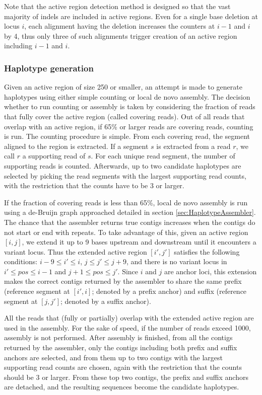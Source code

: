 \documentclass{article}
\begin{document}
Note that the active region detection method is designed so that the vast majority of indels are included in active regions. Even for a single base deletion at locus $i$, each alignment having the deletion increases the counters at $i-1$ and $i$ by 4, thus only three of such alignments trigger creation of an active region including $i-1$ and $i$.


\subsubsection{Haplotype generation}
Given an active region of size 250 or smaller, an attempt is made to generate haplotypes using either simple counting or local de novo assembly. The decision whether to run counting or assembly is taken by considering the fraction of reads that fully cover the active region (called covering reads). Out of all reads that overlap with an active region, if 65\% or larger reads are covering reads, counting is run. The counting procedure is simple. From each covering read, the segment aligned to the region is extracted. If a segment $s$ is extracted from a read $r$, we call $r$ a supporting read of $s$. For each unique read segment, the number of supporting reads is counted. Afterwards, up to two candidate haplotypes are selected by picking the read segments with the largest supporting read counts, with the restriction that the counts have to be 3 or larger.

If the fraction of covering reads is less than 65\%, local de novo assembly is run using a de-Bruijn graph approached detailed in section \ref{sec:HaplotypeAssembler}. The chance that the assembler returns true contigs increases when the contigs do not start or end with repeats. To take advantage of this, given an active region $[i,j]$, we extend it up to 9 bases upstream and downstream until it encounters a variant locus. Thus the extended active region $[i',j']$ satisfies the following conditions: $i-9 \leq i' \leq i$, $j \leq j' \leq j+9$, and there is no variant locus in $i' \leq pos \leq i-1$ and $j+1 \leq pos \leq j'$. Since $i$ and $j$ are anchor loci, this extension makes the correct contigs returned by the assembler to share the same prefix (reference segment at $[i',i]$; denoted by a prefix anchor) and suffix (reference segment at $[j,j']$; denoted by a suffix anchor).

All the reads that (fully or partially) overlap with the extended active region are used in the assembly. For the sake of speed, if the number of reads exceed 1000, assembly is not performed. After assembly is finished, from all the contigs returned by the assembler, only the contigs including both prefix and suffix anchors are selected, and from them up to two contigs with the largest supporting read counts are chosen, again with the restriction that the counts should be 3 or larger. From these top two contigs, the prefix and suffix anchors are detached, and the resulting sequences become the candidate haplotypes.
\end{document}
